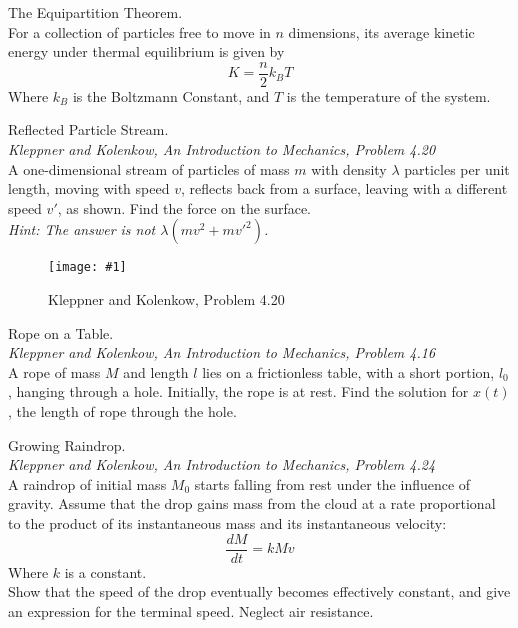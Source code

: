 \documentclass[11pt]{article}
\newcommand{\fig}[4]{
    \begin{figure}[H]
        \centering
        \texttt{[image: \#1]}
        \caption{#2}
        \label{exp4fit}
    \end{figure}
}
\theoremstyle{gangnamstyle}{\newtheorem{definition}{Definition}[]}
\theoremstyle{gangnamstyle}{\newtheorem{example}{Example}[]}
\theoremstyle{gangnamstyle}{\newtheorem{problem}{Problem}[]}
\theoremstyle{gangnamstyle}{\newtheorem{warning}{Warning}[]}
\begin{document}
\begin{definition}
The Equipartition Theorem. \\
For a collection of particles free to move in $n$ dimensions, its average kinetic energy under thermal equilibrium is given by 
\begin{equation}
K = \frac{n}{2}k_BT
\end{equation}
Where $k_B$ is the Boltzmann Constant, and $T$ is the temperature of the system. 
\end{definition}

\begin{problem}
Reflected Particle Stream. \\
\textit{Kleppner and Kolenkow, An Introduction to Mechanics, Problem 4.20} \\
A one-dimensional stream of particles of mass $m$ with density $\lambda$ particles per unit length, moving with speed $v$, reflects back from a surface, leaving with a different speed $v'$, as shown. Find the force on the surface. \\
\textit{Hint: The answer is not $\lambda(mv^2 + mv'^2)$.}
\fig{figs/n4/reflect.png}{Kleppner and Kolenkow, Problem 4.20}{0.4}{0}
\end{problem}

\begin{problem}
Rope on a Table. \\
\textit{Kleppner and Kolenkow, An Introduction to Mechanics, Problem 4.16} \\
A rope of mass $M$ and length $l$ lies on a frictionless table, with a short portion, $l_0$, hanging through a hole. Initially, the rope is at rest. Find the solution for $x(t)$, the length of rope through the hole.
\end{problem}

\begin{problem}
Growing Raindrop. \\
\textit{Kleppner and Kolenkow, An Introduction to Mechanics, Problem 4.24} \\
A raindrop of initial mass $M_0$ starts falling from rest under the influence of gravity. Assume that the drop gains mass from the cloud at a rate proportional to the product of its instantaneous mass and its instantaneous velocity:
\[ \frac{dM}{dt} = kMv \]
Where $k$ is a constant. \\
Show that the speed of the drop eventually becomes effectively constant, and give an expression for the terminal speed. Neglect air resistance.
\end{problem}
\end{document}
